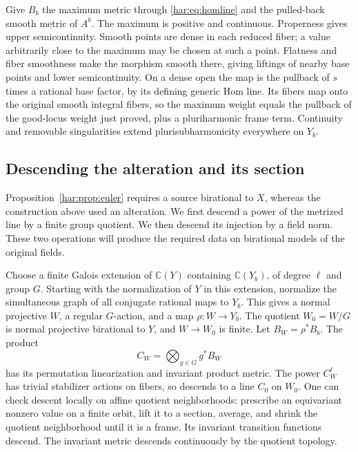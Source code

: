 Give \(B_b\) the maximum metric through \eqref{har:eq:homline} and
the pulled-back smooth metric of \(A^b\). The maximum is positive
and continuous. Properness gives upper semicontinuity. Smooth points
are dense in each reduced fiber; a value arbitrarily close to the
maximum may be chosen at such a point. Flatness and fiber smoothness
make the morphism smooth there, giving liftings of nearby base points
and lower semicontinuity. On a dense open the map is the pullback of
\(s\) times a rational base factor, by its defining generic Hom line.
Its fibers map onto the original smooth integral fibers, so the
maximum weight equals the pullback of the good-locus weight just
proved, plus a pluriharmonic frame term. Continuity and removable
singularities extend plurisubharmonicity everywhere on \(Y_b\).

\subsection{Descending the alteration and its section}\label{har:subsec:alterationnorm}

Proposition~\ref{har:prop:euler} requires a source birational to \(X\),
whereas the construction above used an alteration. We first descend
a power of the metrized line by a finite group quotient. We then
descend its injection by a field norm. These two operations will
produce the required data on birational models of the original fields.

Choose a finite Galois extension of \(\mathbb C(Y)\) containing
\(\mathbb C(Y_b)\), of degree \(\ell\) and group \(G\). Starting
with the normalization of \(Y\) in this extension, normalize the simultaneous graph of
all conjugate rational maps to \(Y_b\). This gives a normal projective
\(W\), a regular \(G\)-action, and a map \(\rho:W\to Y_b\).
The quotient \(W_0=W/G\) is normal projective birational to \(Y\),
and \(W\to W_0\) is finite. Let \(B_W=\rho^*B_b\). The product
\[
 C_W=\bigotimes_{g\in G}g^*B_W
\]
has its permutation linearization and invariant product metric.
The power \(C_W^\ell\) has trivial stabilizer actions on fibers,
so descends to a line \(C_0\) on \(W_0\). One can check descent
locally on affine quotient neighborhoods: prescribe an equivariant
nonzero value on a finite orbit, lift it to a section, average, and
shrink the quotient neighborhood until it is a frame. Its invariant
transition functions descend. The invariant metric descends
continuously by the quotient topology.

